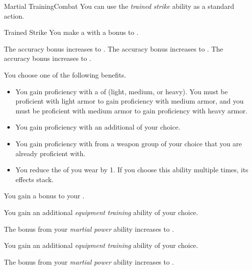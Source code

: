     \begin{feat}{Martial Training}{Combat}
         You can use the \textit{trained strike} ability as a standard action.
        \begin{freeability}{Trained Strike}
            You make a  with a  bonus to .

            \rankline
             The accuracy bonus increases to .
             The accuracy bonus increases to .
             The accuracy bonus increases to .
        \end{freeability}

         You choose one of the following benefits.
        \begin{itemize}
            \item You gain proficiency with a  of  (light, medium, or heavy).
                You must be proficient with light armor to gain proficiency with medium armor, and you must be proficient with medium armor to gain proficiency with heavy armor.
            \item You gain proficiency with an additional  of your choice.
            \item You gain proficiency with  from a weapon group of your choice that you are already proficient with.
            \item You reduce the  of  you wear by 1.
                If you choose this ability multiple times, its effects stack.
        \end{itemize}

         You gain a  bonus to your  .

         You gain an additional \textit{equipment training} ability of your choice.

         The bonus from your \textit{martial power} ability increases to .

         You gain an additional \textit{equipment training} ability of your choice.

         The bonus from your \textit{martial power} ability increases to .
    \end{feat}

